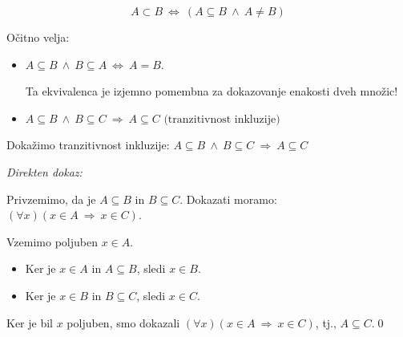 \documentclass[12pt,a4paper]{article}
\def\ali {{~\vee~}}
\def\inn {{~\wedge~}}
\def\sledi {{~\Rightarrow~}}
\def\cee {{~\Leftrightarrow~}}
\begin{document}
$$A\subset B\cee (A\subseteq B \inn A\neq B)$$

Očitno velja:
\begin{itemize}
  \item $A\subseteq B \inn B\subseteq A \cee A = B$.

  Ta ekvivalenca je izjemno pomembna za dokazovanje enakosti dveh množic!
  \item $A\subseteq B \inn B\subseteq C \sledi A \subseteq C \textrm{~(tranzitivnost inkluzije)}$
\end{itemize}


%
%
%
%
%
%
%
%
%
%
%
%
%
%

%
%

Dokažimo tranzitivnost inkluzije: $A\subseteq B \inn B\subseteq C \sledi A \subseteq C$

{\em Direkten dokaz:}

Privzemimo, da je $A\subseteq B$ in $B\subseteq C$.
Dokazati moramo: $(\forall x)(x\in A\sledi x\in C)$.

Vzemimo poljuben $x\in A$.
\begin{itemize}
  \item Ker je $x\in A$ in $A\subseteq B$, sledi $x\in B$.
  \item Ker je $x\in B$ in $B\subseteq C$, sledi $x\in C$.
\end{itemize}
Ker je bil $x$ poljuben, smo dokazali $(\forall x)(x\in A\sledi x\in C)$, tj., $A\subseteq C$.\qed
\end{document}
